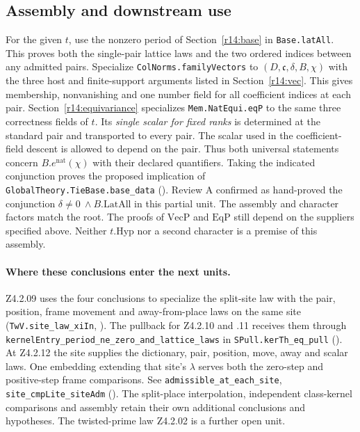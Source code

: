 \subsection{Assembly and downstream use}\label{r14:base-assembly}
For the given $t$, use the nonzero period of Section~\ref{r14:base} in
\nolinkurl{Base.latAll}. This proves both the single-pair lattice laws and
the two ordered indices between any admitted pairs. Specialize
\nolinkurl{ColNorms.familyVectors} to $(D,\mathfrak c,\delta,B,\chi)$ with
the three host and finite-support arguments listed in
Section~\ref{r14:vec}. This gives membership, nonvanishing and one number
field for all coefficient indices at each pair. Section~\ref{r14:equivariance}
specializes \nolinkurl{Mem.NatEqui.eqP} to the same three correctness
fields of $t$. Its \emph{single scalar for fixed ranks} is determined at
the standard pair and transported to every pair. The scalar used in the
coefficient-field descent is allowed to depend on the pair. Thus both
universal statements concern $B.e^{\mathrm{nat}}(\chi)$ with their declared
quantifiers. Taking the indicated conjunction proves the proposed
implication of \nolinkurl{GlobalTheory.TieBase.base_data}
().
Review A confirmed as hand-proved the conjunction $\delta\ne0\ \land B.\mathrm{LatAll}$ in this partial unit. The assembly and character
factors match the root. The proofs of $\mathrm{VecP}$ and
$\mathrm{EqP}$ still depend on the suppliers specified above. Neither $t.\mathrm{Hyp}$ nor a second character
is a premise of this assembly.

\paragraph{Where these conclusions enter the next units.}
Z4.2.09 uses the four conclusions to specialize the split-site law with
the pair, position, frame movement and away-from-place laws on the same
site (\nolinkurl{TwV.site_law_xiIn},
).
The pullback for Z4.2.10 and .11 receives them through
\nolinkurl{kernelEntry_period_ne_zero_and_lattice_laws} in
\nolinkurl{SPull.kerTh_eq_pull}
().
At Z4.2.12 the site supplies the dictionary, pair, position, move,
away and scalar laws. One embedding extending that site's $\lambda$ serves
both the zero-step and positive-step frame comparisons.
See \nolinkurl{admissible_at_each_site}, \nolinkurl{site_cmpLite_siteAdm}
().
The split-place interpolation, independent class-kernel comparisons and
assembly retain their own additional conclusions and hypotheses.
The twisted-prime law Z4.2.02 is a further open unit.

